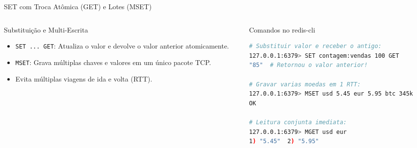 \begin{frame}[fragile]{SET com Troca Atômica (GET) e Lotes (MSET)}
  \begin{columns}[T]
    \begin{column}{0.48\textwidth}
      \alert{Substituição e Multi-Escrita}\par
      \small
      \begin{itemize}
        \item \texttt{SET ... GET}: Atualiza o valor e devolve o valor anterior atomicamente.
        \item \texttt{MSET}: Grava múltiplas chaves e valores em um único pacote TCP.
        \item Evita múltiplas viagens de ida e volta (RTT).
      \end{itemize}
    \end{column}
    \begin{column}{0.50\textwidth}
      \alert{Comandos no redis-cli}\par
      \begin{lstlisting}[language=bash]
# Substituir valor e receber o antigo:
127.0.0.1:6379> SET contagem:vendas 100 GET
"85"  # Retornou o valor anterior!

# Gravar varias moedas em 1 RTT:
127.0.0.1:6379> MSET usd 5.45 eur 5.95 btc 345k
OK

# Leitura conjunta imediata:
127.0.0.1:6379> MGET usd eur
1) "5.45"  2) "5.95"
      \end{lstlisting}
    \end{column}
  \end{columns}
\end{frame}

